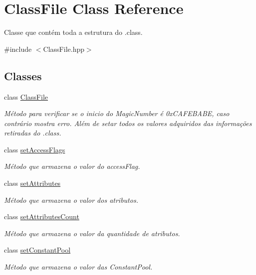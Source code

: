 \hypertarget{classClassFile}{}\section{Class\+File Class Reference}
\label{classClassFile}


Classe que contém toda a estrutura do .class.  




{\ttfamily \#include $<$Class\+File.\+hpp$>$}

\subsection*{Classes}
\begin{DoxyCompactItemize}
\item 
class \hyperlink{classClassFile_1_1ClassFile}{Class\+File}
\begin{DoxyCompactList}\small\item\em Método para verificar se o inicio do Magic\+Number é 0x\+C\+A\+F\+E\+B\+A\+BE, caso contrário mostra erro. Além de setar todos os valores adquiridos das informações retiradas do .class. \end{DoxyCompactList}\item 
class \hyperlink{classClassFile_1_1setAccessFlags}{set\+Access\+Flags}
\begin{DoxyCompactList}\small\item\em Método que armazena o valor do access\+Flag. \end{DoxyCompactList}\item 
class \hyperlink{classClassFile_1_1setAttributes}{set\+Attributes}
\begin{DoxyCompactList}\small\item\em Método que armazena o valor dos atributos. \end{DoxyCompactList}\item 
class \hyperlink{classClassFile_1_1setAttributesCount}{set\+Attributes\+Count}
\begin{DoxyCompactList}\small\item\em Método que armazena o valor da quantidade de atributos. \end{DoxyCompactList}\item 
class \hyperlink{classClassFile_1_1setConstantPool}{set\+Constant\+Pool}
\begin{DoxyCompactList}\small\item\em Método que armazena o valor das Constant\+Pool. \end{DoxyCompactList}\item 

\end{DoxyCompactItemize}
